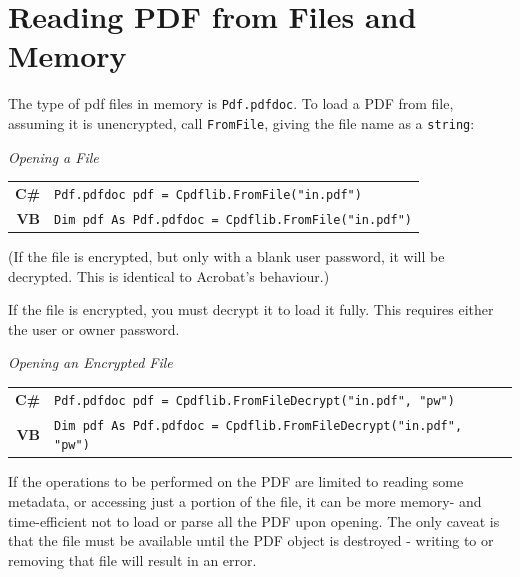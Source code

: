 \documentclass[a4paper]{memoir}
\begin{document}
\section{Reading PDF from Files and Memory}
The type of pdf files in memory is \texttt{Pdf.pdfdoc}. To load a PDF from file, assuming it is unencrypted, call \texttt{FromFile}, giving the file name as a \texttt{string}:
\begin{framed}
\noindent\textit{Opening a File}\\

\noindent\begin{tabular}{rl}
\small\sffamily\textbf{C\#} &
\begin{minipage}{4in}
\small\verb!Pdf.pdfdoc pdf = Cpdflib.FromFile("in.pdf")!
\end{minipage}\\[5mm]
\small\sffamily\textbf{VB} &
\begin{minipage}{4in}
\small\verb!Dim pdf As Pdf.pdfdoc = Cpdflib.FromFile("in.pdf")!
\end{minipage}
\end{tabular}
\end{framed}

(If the file is encrypted, but only with a blank user password, it will be decrypted. This is identical to Acrobat's behaviour.)

If the file is encrypted, you must decrypt it to load it fully. This requires
either the user or owner password.
\begin{framed}
\noindent\textit{Opening an Encrypted File}\\

\noindent\begin{tabular}{rl}
\small\sffamily\textbf{C\#} &
\begin{minipage}{4in}
\small\verb!Pdf.pdfdoc pdf = Cpdflib.FromFileDecrypt("in.pdf", "pw")!
\end{minipage}\\[5mm]
\small\sffamily\textbf{VB} &
\begin{minipage}{4in}
\small\verb!Dim pdf As Pdf.pdfdoc = Cpdflib.FromFileDecrypt("in.pdf", "pw")!
\end{minipage}
\end{tabular}
\end{framed}

If the operations to be performed on the PDF are limited to reading some metadata, or accessing just a portion of the file, it can be more memory- and time-efficient not to load or parse all the PDF upon opening. The only caveat is that the file must be available until the PDF object is destroyed - writing to or removing that file will result in an error.
\end{document}
